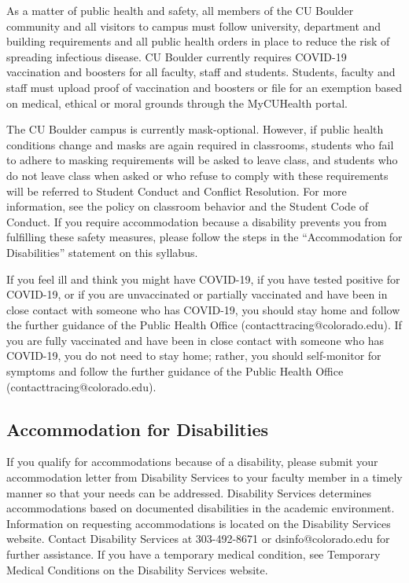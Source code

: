 \documentclass[11pt, a4paper]{article}
\begin{document}
As a matter of public health and safety, all members of the CU Boulder community and all visitors to campus must follow university, department and building requirements and all public health orders in place to reduce the risk of spreading infectious disease. CU Boulder currently requires COVID-19 vaccination and boosters for all faculty, staff and students. Students, faculty and staff must upload proof of vaccination and boosters or file for an exemption based on medical, ethical or moral grounds through the MyCUHealth portal.

The CU Boulder campus is currently mask-optional. However, if public health conditions change and masks are again required in classrooms, students who fail to adhere to masking requirements will be asked to leave class, and students who do not leave class when asked or who refuse to comply with these requirements will be referred to Student Conduct and Conflict Resolution. For more information, see the policy on classroom behavior and the Student Code of Conduct. If you require accommodation because a disability prevents you from fulfilling these safety measures, please follow the steps in the “Accommodation for Disabilities” statement on this syllabus.

If you feel ill and think you might have COVID-19, if you have tested positive for COVID-19, or if you are unvaccinated or partially vaccinated and have been in close contact with someone who has COVID-19, you should stay home and follow the further guidance of the Public Health Office (contacttracing@colorado.edu). If you are fully vaccinated and have been in close contact with someone who has COVID-19, you do not need to stay home; rather, you should self-monitor for symptoms and follow the further guidance of the Public Health Office (contacttracing@colorado.edu).

\subsection*{Accommodation for Disabilities}

If you qualify for accommodations because of a disability, please submit your accommodation letter from Disability Services to your faculty member in a timely manner so that your needs can be addressed.  Disability Services determines accommodations based on documented disabilities in the academic environment.  Information on requesting accommodations is located on the Disability Services website. Contact Disability Services at 303-492-8671 or dsinfo@colorado.edu for further assistance.  If you have a temporary medical condition, see Temporary Medical Conditions on the Disability Services website.
\end{document}
